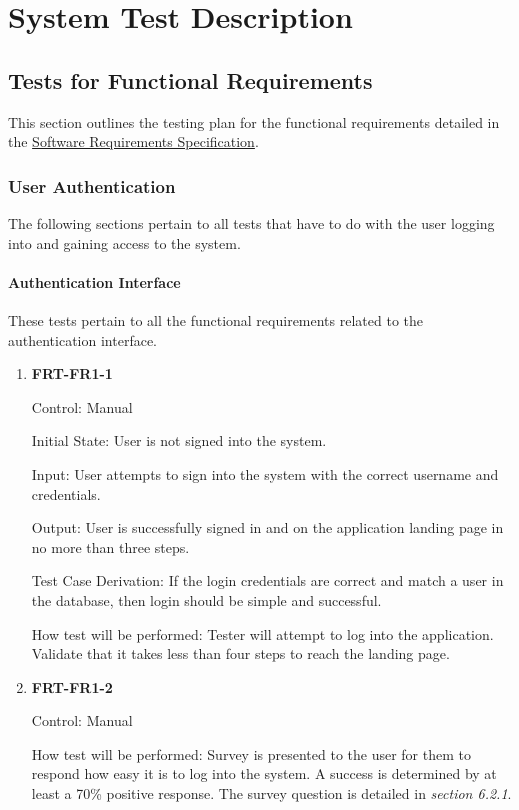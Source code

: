 \documentclass[12pt, titlepage]{article}
\begin{document}
\section{System Test Description}
	
\subsection{Tests for Functional Requirements}

This section outlines the testing plan for the functional requirements detailed in the \href{https://github.com/r-yeh/grocery-spending-tracker/blob/master/docs/SRS/SRS.pdf}{Software Requirements Specification}.

\subsubsection{User Authentication}

The following sections pertain to all tests that have to do with the user logging into and gaining access to the system.

\paragraph{Authentication Interface}

These tests pertain to all the functional requirements related to the authentication interface.

\begin{enumerate}

\item{\textbf{FRT-FR1-1}}

Control: Manual
          
Initial State: User is not signed into the system.
          
Input: User attempts to sign into the system with the correct username and credentials.

Output: User is successfully signed in and on the application landing page in no more than three steps.

Test Case Derivation: If the login credentials are correct and match a user in the database, then login should be simple and successful.
          
How test will be performed: Tester will attempt to log into the application. Validate that it takes less than four steps to reach the landing page.

\item{\textbf{FRT-FR1-2}}

Control: Manual
          
How test will be performed: Survey is presented to the user for them to respond how easy it is to log into the system.
A success is determined by at least a 70\% positive response. The survey question is detailed in \textit{section 6.2.1}.

\end{enumerate}
\end{document}
